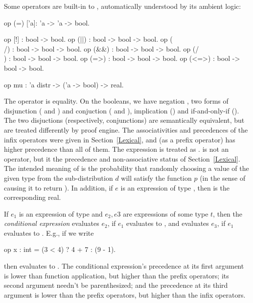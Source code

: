 Some operators are built-in to \EasyCrypt, automatically understood
by its ambient logic:
\begin{easycrypt}{}{}
op (=) ['a]: 'a -> 'a -> bool.

op [!] : bool -> bool.
op (||) : bool -> bool -> bool.
op (\\/) : bool -> bool -> bool.
op (&&) : bool -> bool -> bool.
op (/\\) : bool -> bool -> bool.
op (=>) : bool -> bool -> bool.
op (<=>) : bool -> bool -> bool.

op mu : 'a distr -> ('a -> bool) -> real.
\end{easycrypt}
The operator \ec{=} is equality. On the booleans, we have negation
\ec{!}, two forms of disjunction (\ec{\\/} and \ec{||}) and conjuction
(\ec{/\\} and \ec{&&}), implication (\ec{=>}) and if-and-only-if
(\ec{<=>}).  The two disjuctions (respectively, conjunctions) are
semantically equivalent, but are treated differently by \EasyCrypt
proof engine. The associativities and precedences of the infix
operators were given in Section~\ref{Lexical}, and (as a prefix
operator) \ec{!} has higher precedence than all of them. The
expression  is treated as . \ec{<>} is not an operator, but it the precedence and
non-associative status of Section~\ref{Lexical}.
The intended meaning of  is the probability that
randomly choosing a value of the given type from the sub-distribution
$d$ will satisfy the function $p$ (in the sense of causing it to return
).
In addition, if $e$ is an expression of type , then
 is the corresponding real.

If $e_1$ is an expression of type  and $e_2,e3$ are expressions
of some type $t$, then the \emph{conditional expression}
 evaluates $e_2$, if $e_1$ evaluates to
, and evaluates $e_3$, if $e_1$ evaluates to .
E.g., if we write
\begin{easycrypt}{}{}
op x : int = (3 < 4) ? 4 + 7 : (9 - 1).
\end{easycrypt}
then  evaluates to . The conditional expression's
precedence at its first argument is lower than function
application, but higher than the prefix operators; its second argument
needn't be parenthesized; and the precedence at its third argument is
lower than the prefix operators, but higher than the infix operators.

